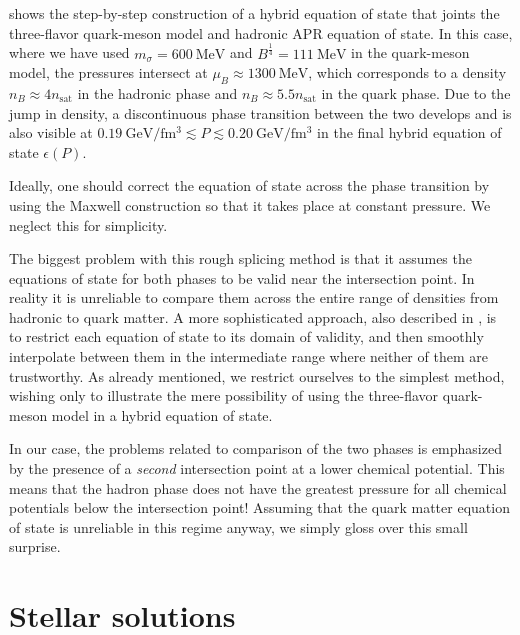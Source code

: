  shows the step-by-step construction of a hybrid equation of state that joints the three-flavor quark-meson model and hadronic APR equation of state.
In this case, where we have used $m_\sigma=\SI{600}{\mega\electronvolt}$ and $B^\frac14 = \SI{111}{\mega\electronvolt}$ in the quark-meson model,
the pressures intersect at $\mu_B \approx \SI{1300}{\mega\electronvolt}$, which corresponds to a density $n_B \approx 4 n_\text{sat}$ in the hadronic phase and $n_B \approx 5.5 n_\text{sat}$ in the quark phase.
Due to the jump in density, a discontinuous phase transition between the two develops and is also visible at $\SI{0.19}{\giga\electronvolt\per\femto\meter\cubed} \lesssim P \lesssim \SI{0.20}{\giga\electronvolt\per\femto\meter\cubed}$ in the final hybrid equation of state $\epsilon(P)$.

Ideally, one should correct the equation of state across the phase transition by using the Maxwell construction so that it takes place at constant pressure.
We neglect this for simplicity.

The biggest problem with this rough splicing method is that it assumes the equations of state for both phases to be valid near the intersection point.
In reality it is unreliable to compare them across the entire range of densities from hadronic to quark matter.
A more sophisticated approach, also described in \cite[section V-F]{ref:quark_star_review},
is to restrict each equation of state to its domain of validity,
and then smoothly interpolate between them in the intermediate range where neither of them are trustworthy.
As already mentioned, we restrict ourselves to the simplest method,
wishing only to illustrate the mere possibility of using the three-flavor quark-meson model in a hybrid equation of state.

In our case,
the problems related to comparison of the two phases is emphasized by the presence of a \emph{second} intersection point at a lower chemical potential.
This means that the hadron phase does not have the greatest pressure for all chemical potentials below the intersection point!
Assuming that the quark matter equation of state is unreliable in this regime anyway, we simply gloss over this small surprise.


\section{Stellar solutions}

